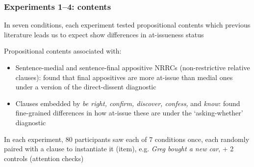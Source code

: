 \documentclass[compress, xcolor = dvipsnames, aspectratio=169, handout]{beamer}
\begin{document}
	\begin{frame}\frametitle{Experiments 1–4: contents}\small
		In seven conditions, each experiment tested propositional contents which previous literature leads us to expect show differences in at-issueness status\medskip\\ \pause

		Propositional contents associated with:
		\begin{itemize}
			\item Sentence-medial and sentence-final appositive NRRCs (non-restrictive relative clauses): \citealt{syrett_experimental_2015} found that final appositives are more at-issue than medial ones under a version of the direct-dissent diagnostic\pause

			\item Clauses embedded by \emph{be right, confirm, discover, confess,} and \emph{know}: \citealt{degen-tonhauser-glossa} found fine-grained differences in how at-issue these are under the `asking-whether' diagnostic\pause
		\end{itemize}

		In each experiment, 80 participants saw each of 7 conditions once, each randomly paired with a clause to instantiate it (item), e.g. \emph{Greg bought a new car}, + 2 controls (attention checks)
		
	\end{frame}
\end{document}
